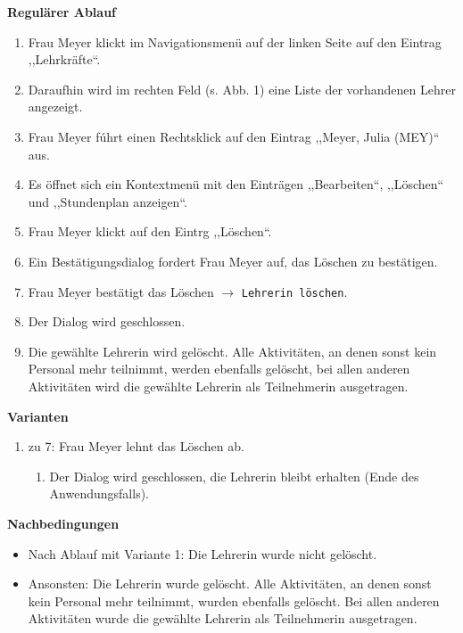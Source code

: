 \documentclass[fontsize=12pt,paper=a4,twoside]{scrartcl}
\begin{document}
\textbf{Regulärer Ablauf}
\begin{enumerate}
\item Frau Meyer klickt im Navigationsmenü auf der linken Seite auf den Eintrag ,,Lehrkr\"afte``.
\item Daraufhin wird im rechten Feld (s. Abb. 1) eine Liste der vorhandenen Lehrer angezeigt.
\item Frau Meyer f\'uhrt einen Rechtsklick auf den Eintrag ,,Meyer, Julia (MEY)`` aus.
\item Es \"offnet sich ein Kontextmen\"u mit den Eintr\"agen ,,Bearbeiten``, ,,L\"oschen`` und ,,Stundenplan anzeigen``.
\item Frau Meyer klickt auf den Eintrg ,,Löschen``.
\item Ein Bestätigungsdialog fordert Frau Meyer auf, das Löschen zu bestätigen.
\item Frau Meyer bestätigt das Löschen $\rightarrow$ \texttt{Lehrerin löschen}.
\item Der Dialog wird geschlossen.
\item Die gewählte Lehrerin wird gelöscht. Alle Aktivitäten, an denen sonst kein Personal mehr teilnimmt, werden ebenfalls gelöscht, bei allen anderen Aktivitäten wird die gewählte Lehrerin als Teilnehmerin ausgetragen.
\end{enumerate}
\vspace{5pt}

\textbf{Varianten}
\begin{enumerate}
\item zu 7: Frau Meyer lehnt das Löschen ab. 
	\begin{enumerate}[label=\arabic*.]
	\item Der Dialog wird geschlossen, die Lehrerin bleibt erhalten (Ende des Anwendungsfalls).
	\end{enumerate}
\end{enumerate}
\vspace{5pt}

\textbf{Nachbedingungen}
\begin{itemize}
\item Nach Ablauf mit Variante 1: Die Lehrerin wurde nicht gel\"oscht.
\item Ansonsten: Die Lehrerin wurde gel\"oscht. Alle Aktivitäten, an denen sonst kein Personal mehr teilnimmt, wurden ebenfalls gelöscht. Bei allen anderen Aktivitäten wurde die gewählte Lehrerin als Teilnehmerin ausgetragen.
\end{itemize}
\vspace{5pt}
\end{document}
